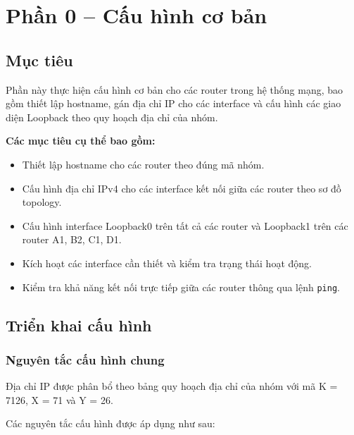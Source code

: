 \section{Phần 0 -- Cấu hình cơ bản}

\subsection{Mục tiêu}

Phần này thực hiện cấu hình cơ bản cho các router
trong hệ thống mạng, bao gồm thiết lập hostname,
gán địa chỉ IP cho các interface và cấu hình
các giao diện Loopback theo quy hoạch địa chỉ
của nhóm.

\textbf{Các mục tiêu cụ thể bao gồm:}

\begin{itemize}
    \item Thiết lập hostname cho các router
    theo đúng mã nhóm.

    \item Cấu hình địa chỉ IPv4 cho các
    interface kết nối giữa các router
    theo sơ đồ topology.

    \item Cấu hình interface Loopback0
    trên tất cả các router và Loopback1
    trên các router A1, B2, C1, D1.

    \item Kích hoạt các interface cần thiết
    và kiểm tra trạng thái hoạt động.

    \item Kiểm tra khả năng kết nối trực tiếp
    giữa các router thông qua lệnh
    \texttt{ping}.
\end{itemize}

\subsection{Triển khai cấu hình}

\subsubsection{Nguyên tắc cấu hình chung}

Địa chỉ IP được phân bổ theo bảng quy hoạch
địa chỉ của nhóm với mã K = 7126,
X = 71 và Y = 26.

Các nguyên tắc cấu hình được áp dụng như sau:

